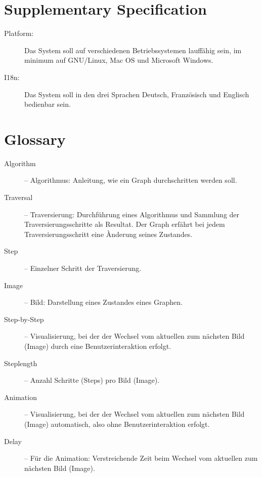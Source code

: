 \section{Supplementary Specification}
\label{sec:Supplementary Specification}
\begin{description}
  \item[Platform:] Das System soll auf verschiedenen Betriebssystemen lauff\"ahig sein, im minimum auf GNU/Linux, Mac OS und Microsoft Windows.
  \item[I18n:] Das System soll in den drei Sprachen Deutsch, Franz\"osisch und Englisch bedienbar sein.
\end{description}
% 
\section{Glossary}
\label{sec:Glossary}
\begin{description}
  \item[Algorithm] -- Algorithmus: Anleitung, wie ein Graph durchschritten werden soll.
  \item[Traversal] -- Traversierung: Durchf\"uhrung eines Algorithmus und Sammlung der Traversierungsschritte als Resultat. Der Graph erf\"ahrt bei jedem Traversierungsschritt eine \`Anderung seines Zustandes.
  \item[Step] -- Einzelner Schritt der Traversierung.
  \item[Image] -- Bild: Darstellung eines Zustandes eines Graphen.
  \item[Step-by-Step] -- Visualisierung, bei der der Wechsel vom aktuellen zum n\"achsten Bild (Image) durch eine Benutzerinteraktion erfolgt.
  \item[Steplength] -- Anzahl Schritte (Steps) pro Bild (Image).
  \item[Animation] -- Visualisierung, bei der der Wechsel vom aktuellen zum n\"achsten Bild (Image) automatisch, also ohne Benutzerinteraktion erfolgt.
  \item[Delay] -- F\"ur die Animation: Verstreichende Zeit beim Wechsel vom aktuellen zum n\"achsten Bild (Image).
\end{description}
% 
